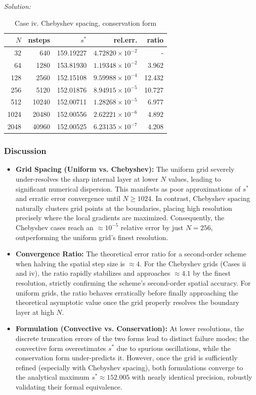 \documentclass[11pt]{article}
\newenvironment{solution}
    {\textit{Solution:}}
    {}
\begin{document}
\begin{solution}
\begin{table}[H]
\centering
\caption{Case iv. Chebyshev spacing, conservation form}
\begin{tabular}{@{}rrrrr@{}}
\toprule
$N$ & nsteps & $s^*$ & rel.err. & ratio \\
\midrule
  32 &   640 & 159.19227 & $4.72820 \times 10^{-2}$ & - \\
  64 &  1280 & 153.81930 & $1.19348 \times 10^{-2}$ & 3.962 \\
 128 &  2560 & 152.15108 & $9.59988 \times 10^{-4}$ & 12.432 \\
 256 &  5120 & 152.01876 & $8.94915 \times 10^{-5}$ & 10.727 \\
 512 & 10240 & 152.00711 & $1.28268 \times 10^{-5}$ & 6.977 \\
1024 & 20480 & 152.00556 & $2.62221 \times 10^{-6}$ & 4.892 \\
2048 & 40960 & 152.00525 & $6.23135 \times 10^{-7}$ & 4.208 \\
\bottomrule
\end{tabular}
\end{table}

\subsubsection*{Discussion}
\begin{itemize}
    \item \textbf{Grid Spacing (Uniform vs. Chebyshev):} The uniform grid severely under-resolves the sharp internal layer at lower $N$ values, leading to significant numerical dispersion. This manifests as poor approximations of $s^*$ and erratic error convergence until $N \ge 1024$. In contrast, Chebyshev spacing naturally clusters grid points at the boundaries, placing high resolution precisely where the local gradients are maximized. Consequently, the Chebyshev cases reach an $\approx 10^{-5}$ relative error by just $N=256$, outperforming the uniform grid's finest resolution.
    \item \textbf{Convergence Ratio:} The theoretical error ratio for a second-order scheme when halving the spatial step size is $\approx 4$. For the Chebyshev grids (Cases ii and iv), the ratio rapidly stabilizes and approaches $\approx 4.1$ by the finest resolution, strictly confirming the scheme's second-order spatial accuracy. For uniform grids, the ratio behaves erratically before finally approaching the theoretical asymptotic value once the grid properly resolves the boundary layer at high $N$.
    \item \textbf{Formulation (Convective vs. Conservation):} At lower resolutions, the discrete truncation errors of the two forms lead to distinct failure modes; the convective form overestimates $s^*$ due to spurious oscillations, while the conservation form under-predicts it. However, once the grid is sufficiently refined (especially with Chebyshev spacing), both formulations converge to the analytical maximum $s^* \approx 152.005$ with nearly identical precision, robustly validating their formal equivalence.
\end{itemize}
\FloatBarrier

\end{solution} 
\end{document}
